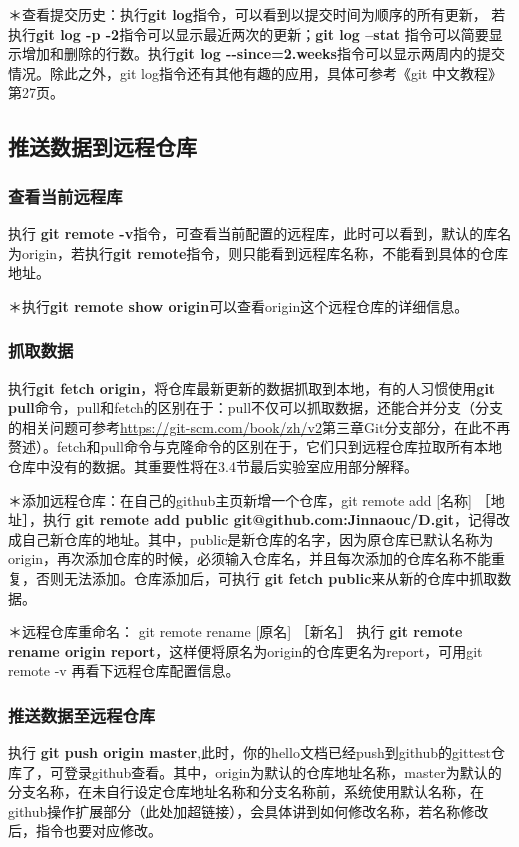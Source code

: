 \documentclass{article}
\begin{document}
＊查看提交历史：执行\textbf{git log}指令，可以看到以提交时间为顺序的所有更新， 若执行\textbf{git log -p -2}指令可以显示最近两次的更新；\textbf{git log --stat} 指令可以简要显示增加和删除的行数。执行\textbf{git log {-}{-}since=2.weeks}指令可以显示两周内的提交情况。除此之外，git log指令还有其他有趣的应用，具体可参考《git 中文教程》 第27页。


\subsection{推送数据到远程仓库}
\subsubsection{查看当前远程库}
执行 \textbf{git remote -v}指令，可查看当前配置的远程库，此时可以看到，默认的库名为origin，若执行\textbf{git remote}指令，则只能看到远程库名称，不能看到具体的仓库地址。

＊执行\textbf{git remote show origin}可以查看origin这个远程仓库的详细信息。

\subsubsection{抓取数据}
执行\textbf{git fetch origin}，将仓库最新更新的数据抓取到本地，有的人习惯使用\textbf{git pull}命令，pull和fetch的区别在于：pull不仅可以抓取数据，还能合并分支（分支的相关问题可参考\url{https://git-scm.com/book/zh/v2}第三章Git分支部分，在此不再赘述）。fetch和pull命令与克隆命令的区别在于，它们只到远程仓库拉取所有本地仓库中没有的数据。其重要性将在3.4节最后实验室应用部分解释。

＊添加远程仓库：在自己的github主页新增一个仓库，git remote add [名称] ［地址］，执行 \textbf{git remote add public git@github.com:Jinnaouc/D.git}，记得改成自己新仓库的地址。其中，public是新仓库的名字，因为原仓库已默认名称为origin，再次添加仓库的时候，必须输入仓库名，并且每次添加的仓库名称不能重复，否则无法添加。仓库添加后，可执行 \textbf{git fetch public}来从新的仓库中抓取数据。

＊远程仓库重命名： git remote rename [原名] ［新名］ 执行 \textbf{git remote rename origin report}，这样便将原名为origin的仓库更名为report，可用git remote -v 再看下远程仓库配置信息。
\subsubsection{推送数据至远程仓库}
执行 \textbf{git push origin master},此时，你的hello文档已经push到github的gittest仓库了，可登录github查看。其中，origin为默认的仓库地址名称，master为默认的分支名称，在未自行设定仓库地址名称和分支名称前，系统使用默认名称，在github操作扩展部分（此处加超链接），会具体讲到如何修改名称，若名称修改后，指令也要对应修改。
\end{document}
